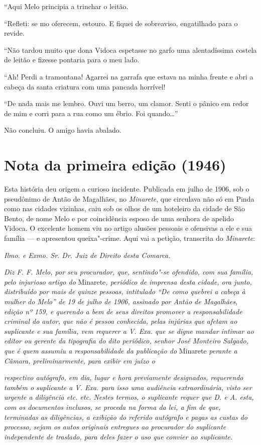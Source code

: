 ``Aqui Melo principia a trinchar o leitão.

``Refleti: se mo oferecem, estouro. E fiquei de sobreaviso, engatilhado
para o revide.

``Não tardou muito que dona Vidoca espetasse no garfo uma alentadíssima
costela de leitão e fizesse pontaria para o meu lado.

``Ah! Perdi a tramontana! Agarrei na garrafa que estava na minha frente
e abri a cabeça da santa criatura com uma pancada horrível!

``De nada mais me lembro. Ouvi um berro, um clamor. Senti o pânico em
redor de mim e corri para a rua como um ébrio. Foi quando\ldots{}''

Não concluiu. O amigo havia abalado.

\section*{Nota da primeira edição (1946)}

Esta história deu origem a curioso incidente. Publicada em julho de
1906, sob o pseudônimo de Antão de Magalhães, no \emph{Minarete}, que
circulava não só em Pinda como nas cidades vizinhas, caiu sob os olhos
de um hoteleiro da cidade de São Bento, de nome Melo e por coincidência
esposo de uma senhora de apelido Vidoca. O excelente homem viu no artigo
alusões pessoais e ofensivas a ele e sua família --- e apresentou
queixa"-crime. Aqui vai a petição, transcrita do \emph{Minarete}:

\emph{Ilmo. e Exmo. Sr. Dr. Juiz de Direito desta Comarca.}

\emph{Diz F. F. Melo, por seu procurador, que, sentindo"-se ofendido, com
sua família, pelo injurioso artigo do} Minarete\emph{, periódico de
imprensa desta cidade, ora junto, distribuído por mais de quinze
pessoas, intitulado ``De como quebrei a cabeça à mulher do Melo'' de 19
de julho de 1906, assinado por Antão de Magalhães, edição nº 159, e
querendo a bem de seus direitos promover a responsabilidade criminal do
autor, que não é pessoa conhecida, pelas injúrias que afetam ao
suplicante e sua família, vem requerer a V. Exa. que se digne mandar
intimar ao editor ou gerente da tipografia do dito periódico, senhor
José Monteiro Salgado, que é quem assumiu a responsabilidade da
publicação do} Minarete \emph{perante a Câmara, preliminarmente, para
exibir em juízo o}

\emph{respectivo autógrafo, em dia, lugar e hora previamente designados,
requerendo também o suplicante a V. Exa. para isso uma audiência
extraordinária, visto ser urgente a diligência etc. etc. Nestes termos,
o suplicante requer que D. e A. esta, com os documentos inclusos, se
proceda na forma da lei, a fim de que, terminadas as diligências, a
exibição do referido autógrafo e pagas as custas do processo, sejam os
autos originais entregues ao procurador do suplicante independente de
traslado, para deles fazer o uso que convier ao suplicante.}

